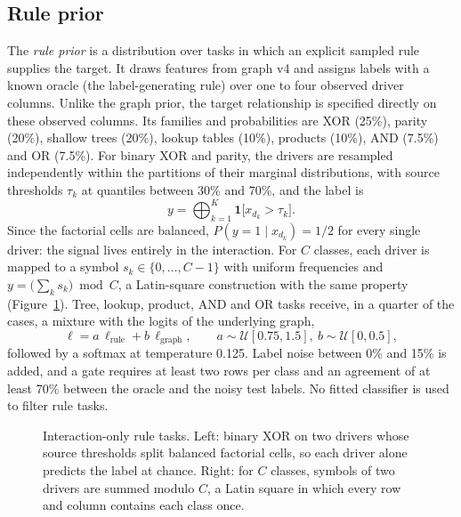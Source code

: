 \documentclass[11pt]{article}
\begin{document}
\subsection{Rule prior}
The \emph{rule prior} is a distribution over tasks in which an explicit sampled rule supplies the
target. It draws features from graph v4 and assigns labels with a known oracle (the label-generating
rule) over one to four observed driver columns. Unlike the graph prior, the target relationship is
specified directly on these observed columns. Its families and probabilities are XOR (25\%), parity (20\%), shallow trees
(20\%), lookup tables (10\%), products (10\%), AND (7.5\%) and OR (7.5\%). For binary XOR and parity,
the drivers are resampled independently within the partitions of their marginal distributions, with
source thresholds $\tau_k$ at quantiles between 30\% and 70\%, and the label is
\begin{equation}
y=\bigoplus_{k=1}^{K}\mathbf{1}\big[x_{d_k}>\tau_k\big].
\end{equation}
Since the factorial cells are balanced, $P(y=1\mid x_{d_k})=1/2$ for every single driver: the
signal lives entirely in the interaction. For $C$ classes, each driver is mapped to a symbol
$s_k\in\{0,\dots,C-1\}$ with uniform frequencies and $y=\big(\sum_k s_k\big)\bmod C$, a Latin-square
construction with the same property (Figure~\ref{fig:rules}). Tree, lookup, product, AND and OR tasks receive, in a quarter
of the cases, a mixture with the logits of the underlying graph,
\begin{equation}
\ell=a\,\ell_{\mathrm{rule}}+b\,\ell_{\mathrm{graph}},\qquad a\sim\mathcal{U}[0.75,1.5],\ b\sim\mathcal{U}[0,0.5],
\end{equation}
followed by a softmax at temperature 0.125. Label noise between 0\% and 15\% is added, and a gate
requires at least two rows per class and an agreement of at least 70\% between the oracle and the
noisy test labels. No fitted classifier is used to filter rule tasks.

\begin{figure}[tbp]
\centering

\caption{Interaction-only rule tasks. Left: binary XOR on two drivers whose source thresholds split
balanced factorial cells, so each driver alone predicts the label at chance. Right: for $C$ classes,
symbols of two drivers are summed modulo $C$, a Latin square in which every row and column contains
each class once.}
\label{fig:rules}
\end{figure}
\end{document}
